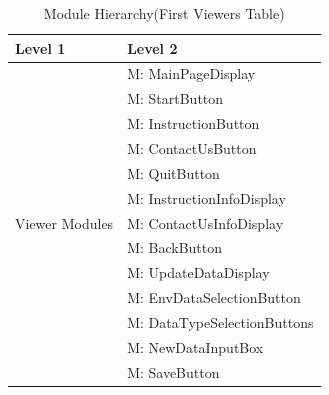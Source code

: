 \documentclass[12pt, titlepage]{article}
\newcounter{mnum}
\newcommand{\mthemnum}{M\themnum}
\begin{document}
\newpage

\begin{table}[H]
\caption{Module Hierarchy(First Viewers Table)}
\label{TblViewers1}

\centering
\begin{tabular}{p{} p{}}
\toprule
\textbf{Level 1} & \textbf{Level 2}\\
\midrule

\multirow{13}{0.3\textwidth}{Viewer Modules}
& {mnum} \mthemnum \label{Viwer1}: MainPageDisplay \\
& {mnum} \mthemnum \label{Viwer2}: StartButton \\
& {mnum} \mthemnum \label{Viwer3}: InstructionButton \\
& {mnum} \mthemnum \label{Viwer4}: ContactUsButton \\
& {mnum} \mthemnum \label{Viwer5}: QuitButton \\
& {mnum} \mthemnum \label{Viwer6}: InstructionInfoDisplay \\
& {mnum} \mthemnum \label{Viwer7}: ContactUsInfoDisplay \\ 
& {mnum} \mthemnum \label{Viwer8}: BackButton \\
& {mnum} \mthemnum \label{Viwer9}: UpdateDataDisplay \\
& {mnum} \mthemnum \label{Viwer10}: EnvDataSelectionButton \\
& {mnum} \mthemnum \label{Viwer11}: DataTypeSelectionButtons \\
& {mnum} \mthemnum \label{Viwer12}: NewDataInputBox \\
& {mnum} \mthemnum \label{Viwer13}: SaveButton \\
\bottomrule
\end{tabular}
\end{table}

\newpage
\end{document}
